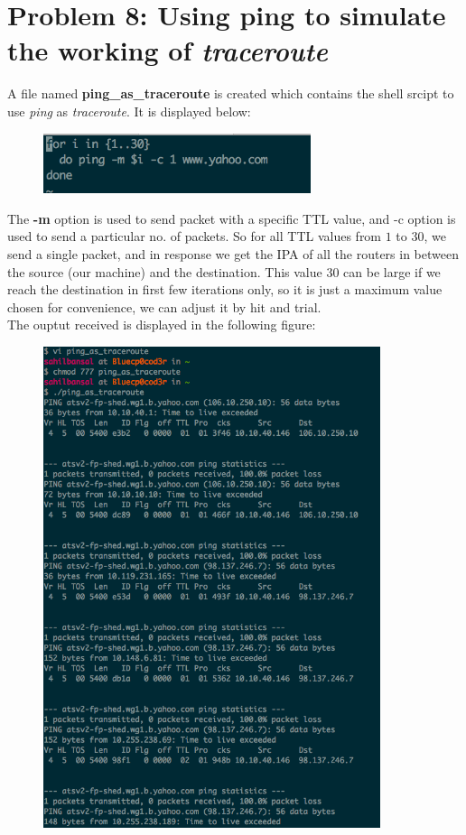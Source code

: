 \documentclass[]{report}
\begin{document}
\section{Problem 8: Using ping to simulate the working of \textit{traceroute}}
A file named \textbf{ping\_as\_traceroute} is created which contains the shell srcipt to use \textit{ping} as \textit{traceroute}. It is displayed below:
\begin{figure}[H]
	\vspace{0pt}
	\includegraphics[height = 50pt, keepaspectratio]{Snapshots/exe8/q8_1.png}
\end{figure} 
The \textbf{-m} option is used to send packet with a specific TTL value, and -c option is used to send a particular no. of packets. So for all TTL values from $1$ to $30$, we send a single packet, and in response we get the IPA of all the routers in between the source (our machine) and the destination. This value $30$ can be large if we reach the destination in first few iterations only, so it is just a maximum value chosen for convenience, we can adjust it by hit and trial.
\\
The ouptut received is displayed in the following figure:
\begin{figure}[H]
	\vspace{0pt}
	\includegraphics[height = 400pt, keepaspectratio]{Snapshots/exe8/q8_2.png}
\end{figure} 
\end{document}
